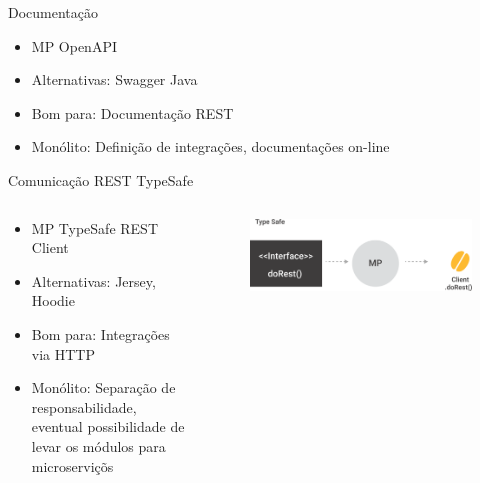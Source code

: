 \documentclass[aspectratio=169]{beamer}
\begin{document}
\begin{frame}{Documentação}

\begin{itemize}
    \item MP OpenAPI
    \item Alternativas: Swagger Java
    \item Bom para: Documentação REST
    \item Monólito: Definição de integrações, documentações on-line
\end{itemize}
\end{frame}

\begin{frame}{Comunicação REST TypeSafe}

\begin{columns}
    \begin{column}{0.7\textwidth}
\begin{itemize}
    \item MP TypeSafe REST Client
    \item Alternativas: Jersey, Hoodie
    \item Bom para: Integrações via HTTP
    \item Monólito: Separação de responsabilidade, eventual possibilidade de levar os módulos para microserviçõs
\end{itemize}
	\end{column}
	\begin{column}{0.4\textwidth}  %

\begin{figure}
	\centering
	\includegraphics[width=\linewidth]{Images/typesafe}
\end{figure}

	\end{column}
\end{columns}

\end{frame}
\end{document}
